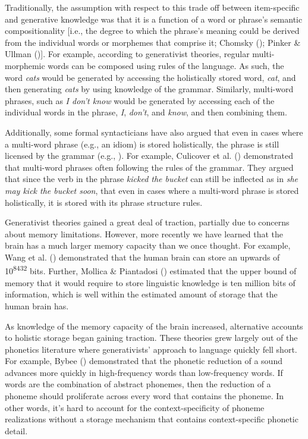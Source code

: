 \documentclass[
  12pt,
]{scrartcl}
\begin{document}
Traditionally, the assumption with respect to this trade off between
item-specific and generative knowledge was that it is a function of a
word or phrase's semantic compositionality {[}i.e., the degree to which
the phrase's meaning could be derived from the individual words or
morphemes that comprise it; Chomsky
(); Pinker \& Ullman
(){]}. For example, according
to generativist theories, regular multi-morphemic words can be composed
using rules of the language. As such, the word \emph{cats} would be
generated by accessing the holistically stored word, \emph{cat}, and
then generating \emph{cats} by using knowledge of the grammar.
Similarly, multi-word phrases, such as \emph{I don't know} would be
generated by accessing each of the individual words in the phrase,
\emph{I}, \emph{don't}, and \emph{know}, and then combining them.

Additionally, some formal syntacticians have also argued that even in
cases where a multi-word phrase (e.g., an idiom) is stored holistically,
the phrase is still licensed by the grammar (e.g.,
). For example, Culicover et al.
()
demonstrated that multi-word phrases often following the rules of the
grammar. They argued that since the verb in the phrase \emph{kicked the
bucket} can still be inflected as in \emph{she may kick the bucket
soon}, that even in cases where a multi-word phrase is stored
holistically, it is stored with its phrase structure rules.

Generativist theories gained a great deal of traction, partially due to
concerns about memory limitations. However, more recently we have
learned that the brain has a much larger memory capacity than we once
thought. For example, Wang et al.
() demonstrated
that the human brain can store an upwards of 10\textsuperscript{8432}
bits. Further, Mollica \& Piantadosi
() estimated that
the upper bound of memory that it would require to store linguistic
knowledge is ten million bits of information, which is well within the
estimated amount of storage that the human brain has.

As knowledge of the memory capacity of the brain increased, alternative
accounts to holistic storage began gaining traction. These theories grew
largely out of the phonetics literature where generativists' approach to
language quickly fell short. For example, Bybee
() demonstrated that
the phonetic reduction of a sound advances more quickly in
high-frequency words than low-frequency words. If words are the
combination of abstract phonemes, then the reduction of a phoneme should
proliferate across every word that contains the phoneme. In other words,
it's hard to account for the context-specificity of phoneme realizations
without a storage mechanism that contains context-specific phonetic
detail.
\end{document}

